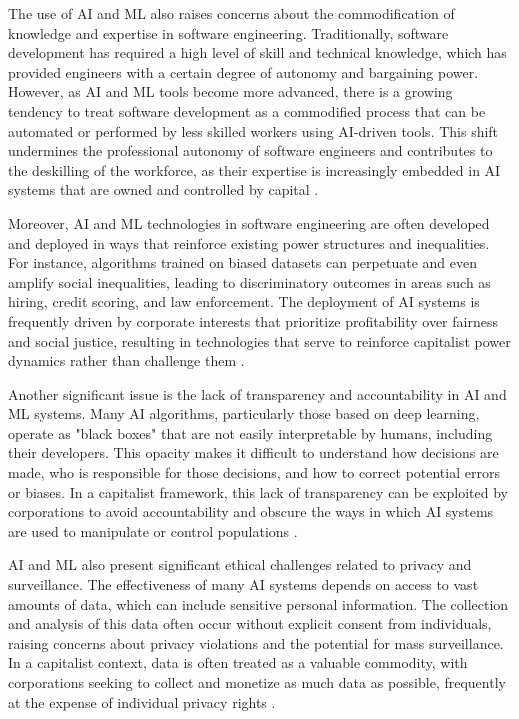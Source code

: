\begin{refsection}
The use of AI and ML also raises concerns about the commodification of knowledge and expertise in software engineering. Traditionally, software development has required a high level of skill and technical knowledge, which has provided engineers with a certain degree of autonomy and bargaining power. However, as AI and ML tools become more advanced, there is a growing tendency to treat software development as a commodified process that can be automated or performed by less skilled workers using AI-driven tools. This shift undermines the professional autonomy of software engineers and contributes to the deskilling of the workforce, as their expertise is increasingly embedded in AI systems that are owned and controlled by capital \cite[pp.~110-113]{fuchs2014digital}.

Moreover, AI and ML technologies in software engineering are often developed and deployed in ways that reinforce existing power structures and inequalities. For instance, algorithms trained on biased datasets can perpetuate and even amplify social inequalities, leading to discriminatory outcomes in areas such as hiring, credit scoring, and law enforcement. The deployment of AI systems is frequently driven by corporate interests that prioritize profitability over fairness and social justice, resulting in technologies that serve to reinforce capitalist power dynamics rather than challenge them \cite[pp.~14-17]{noble2018algorithms}.

Another significant issue is the lack of transparency and accountability in AI and ML systems. Many AI algorithms, particularly those based on deep learning, operate as "black boxes" that are not easily interpretable by humans, including their developers. This opacity makes it difficult to understand how decisions are made, who is responsible for those decisions, and how to correct potential errors or biases. In a capitalist framework, this lack of transparency can be exploited by corporations to avoid accountability and obscure the ways in which AI systems are used to manipulate or control populations \cite[pp.~89-91]{mittelstadt2016ethics}.

AI and ML also present significant ethical challenges related to privacy and surveillance. The effectiveness of many AI systems depends on access to vast amounts of data, which can include sensitive personal information. The collection and analysis of this data often occur without explicit consent from individuals, raising concerns about privacy violations and the potential for mass surveillance. In a capitalist context, data is often treated as a valuable commodity, with corporations seeking to collect and monetize as much data as possible, frequently at the expense of individual privacy rights \cite[pp.~77-80]{zuboff2020age}.


\end{refsection}
